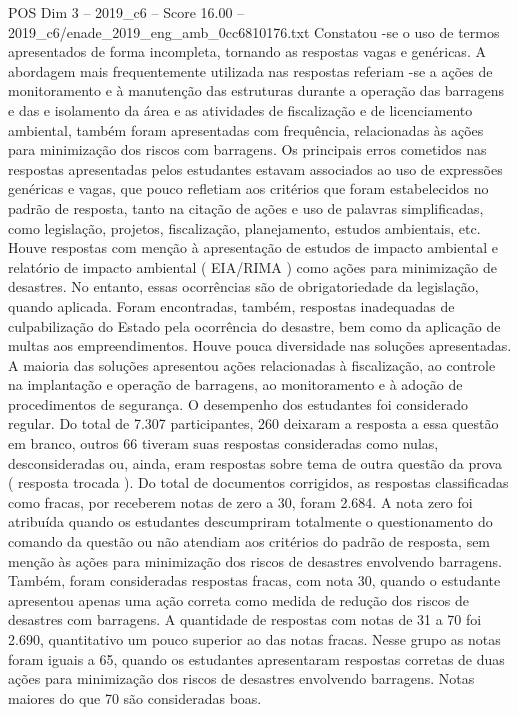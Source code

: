 \begin{textsample}{POS Dim 3 – 2019\_c6 – Score 16.00 – 2019\_c6/enade\_2019\_eng\_amb\_0cc6810176.txt}
Constatou -se o uso de termos apresentados de forma incompleta, tornando as respostas vagas e genéricas.
A abordagem mais frequentemente utilizada nas respostas referiam -se a ações de monitoramento e à manutenção das estruturas durante a operação das barragens e das e isolamento da área e as atividades de fiscalização e de licenciamento ambiental, também foram apresentadas com frequência, relacionadas às ações para minimização dos riscos com barragens.
Os principais erros cometidos nas respostas apresentadas pelos estudantes estavam associados ao uso de expressões genéricas e vagas, que pouco refletiam aos critérios que foram estabelecidos no padrão de resposta, tanto na citação de ações e uso de palavras simplificadas, como legislação, projetos, fiscalização, planejamento, estudos ambientais, etc.
Houve respostas com menção à apresentação de estudos de impacto ambiental e relatório de impacto ambiental ( EIA/RIMA ) como ações para minimização de desastres.
No entanto, essas ocorrências são de obrigatoriedade da legislação, quando aplicada.
Foram encontradas, também, respostas inadequadas de culpabilização do Estado pela ocorrência do desastre, bem como da aplicação de multas aos empreendimentos.
Houve pouca diversidade nas soluções apresentadas.
A maioria das soluções apresentou ações relacionadas à fiscalização, ao controle na implantação e operação de barragens, ao monitoramento e à adoção de procedimentos de segurança.
O desempenho dos estudantes foi considerado regular.
Do total de 7.307 participantes, 260 deixaram a resposta a essa questão em branco, outros 66 tiveram suas respostas consideradas como nulas, desconsideradas ou, ainda, eram respostas sobre tema de outra questão da prova ( resposta trocada ).
Do total de documentos corrigidos, as respostas classificadas como fracas, por receberem notas de zero a 30, foram 2.684.
A nota zero foi atribuída quando os estudantes descumpriram totalmente o questionamento do comando da questão ou não atendiam aos critérios do padrão de resposta, sem menção às ações para minimização dos riscos de desastres envolvendo barragens.
Também, foram consideradas respostas fracas, com nota 30, quando o estudante apresentou apenas uma ação correta como medida de redução dos riscos de desastres com barragens.
A quantidade de respostas com notas de 31 a 70 foi 2.690, quantitativo um pouco superior ao das notas fracas.
Nesse grupo as notas foram iguais a 65, quando os estudantes apresentaram respostas corretas de duas ações para minimização dos riscos de desastres envolvendo barragens.
Notas maiores do que 70 são consideradas boas.

\end{textsample}
